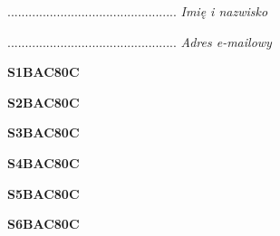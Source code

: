 \begin{turn}{90}\begin{minipage}{\linewidth} \vspace{20mm} ................................................  \textit{Imię i nazwisko}\end{minipage}\end{turn}

\begin{turn}{90}\begin{minipage}{\linewidth} \vspace{20mm} ................................................  \textit{Adres e-mailowy}\end{minipage}\end{turn}

\begin{turn}{90}\huge \begin{minipage}{\linewidth} \vspace{10mm}\textbf{S1BAC80C}\end{minipage}\end{turn}

\begin{turn}{90}\huge \begin{minipage}{\linewidth} \vspace{10mm}\textbf{S2BAC80C}\end{minipage}\end{turn}

\begin{turn}{90}\huge \begin{minipage}{\linewidth} \vspace{10mm}\textbf{S3BAC80C}\end{minipage}\end{turn}

\begin{turn}{90}\huge \begin{minipage}{\linewidth} \vspace{10mm}\textbf{S4BAC80C}\end{minipage}\end{turn}

\begin{turn}{90}\huge \begin{minipage}{\linewidth} \vspace{10mm}\textbf{S5BAC80C}\end{minipage}\end{turn}

\begin{turn}{90}\huge \begin{minipage}{\linewidth} \vspace{10mm}\textbf{S6BAC80C}\end{minipage}\end{turn}

